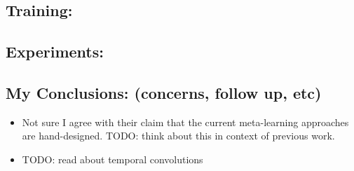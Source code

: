 \subsection{Training:}

\subsection{Experiments:}

\subsection{My Conclusions: (concerns, follow up, etc)}

\begin{itemize}
    \item Not sure I agree with their claim that the current meta-learning approaches are hand-designed.
          TODO: think about this in context of previous work.
    \item TODO: read about temporal convolutions
\end{itemize}


